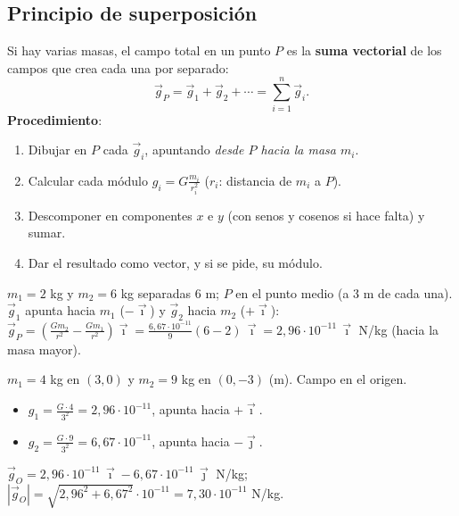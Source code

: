 \documentclass[11pt,a4paper]{article}
\newcommand{\ii}{\vec{\imath}}
\newcommand{\jj}{\vec{\jmath}}
\begin{document}
\subsection{Principio de superposición}
Si hay varias masas, el campo total en un punto $P$ es la \textbf{suma vectorial} de los campos que crea cada una por separado:
\[
\vec g_P=\vec g_1+\vec g_2+\cdots=\sum_{i=1}^n\vec g_i .
\]
\textbf{Procedimiento}:
\begin{enumerate}[itemsep=1pt]
  \item Dibujar en $P$ cada $\vec g_i$, apuntando \emph{desde $P$ hacia la masa $m_i$}.
  \item Calcular cada módulo $g_i=G\frac{m_i}{r_i^2}$ ($r_i$: distancia de $m_i$ a $P$).
  \item Descomponer en componentes $x$ e $y$ (con senos y cosenos si hace falta) y sumar.
  \item Dar el resultado como vector, y si se pide, su módulo.
\end{enumerate}

\begin{ejemplo}[title={Ejemplo: masas alineadas}]
$m_1=2$ kg y $m_2=6$ kg separadas 6 m; $P$ en el punto medio (a 3 m de cada una). $\vec g_1$ apunta hacia $m_1$ ($-\ii$) y $\vec g_2$ hacia $m_2$ ($+\ii$):
$\vec g_P=\left(\frac{Gm_2}{r^2}-\frac{Gm_1}{r^2}\right)\ii=\frac{6{,}67\cdot10^{-11}}{9}(6-2)\,\ii=2{,}96\cdot10^{-11}\,\ii$ N/kg (hacia la masa mayor).
\end{ejemplo}

\begin{ejemplo}[title={Ejemplo: masas en los ejes}]
\begin{minipage}{0.62\textwidth}
$m_1=4$ kg en $(3,0)$ y $m_2=9$ kg en $(0,-3)$ (m). Campo en el origen.
\begin{itemize}[itemsep=1pt]
  \item $g_1=\frac{G\cdot4}{3^2}=2{,}96\cdot10^{-11}$, apunta hacia $+\ii$.
  \item $g_2=\frac{G\cdot9}{3^2}=6{,}67\cdot10^{-11}$, apunta hacia $-\jj$.
\end{itemize}
$\vec g_O=2{,}96\cdot10^{-11}\,\ii-6{,}67\cdot10^{-11}\,\jj$ N/kg;\\
$|\vec g_O|=\sqrt{2{,}96^2+6{,}67^2}\cdot10^{-11}=7{,}30\cdot10^{-11}$ N/kg.
\end{minipage}\hfill
\begin{minipage}{0.33\textwidth}
\end{minipage}
\end{ejemplo}
\end{document}
